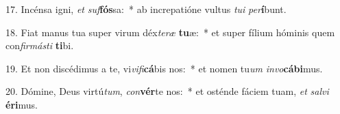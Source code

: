 17. Incénsa igni, \textit{et} \textit{suf}\textbf{fós}sa:~*  ab increpatióne vultus \textit{tu}\textit{i} \textit{per}\textbf{í}bunt.\

18. Fiat manus tua super virum déx\textit{te}\textit{ræ} \textbf{tu}æ:~*  et super fílium hóminis quem con\textit{fir}\textit{más}\textit{ti} \textbf{ti}bi.\

19. Et non discédimus a te, vi\textit{vi}\textit{fi}\textbf{cá}bis nos:~*  et nomen tu\textit{um} \textit{in}\textit{vo}\textbf{cá}\textbf{bi}mus.\

20. Dómine, Deus virtú\textit{tum}, \textit{con}\textbf{vér}te nos:~*  et osténde fáciem tuam, \textit{et} \textit{sal}\textit{vi} \textbf{é}\textbf{ri}mus.\

